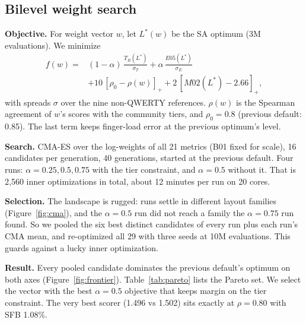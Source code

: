 \documentclass{gecko-paper}
\begin{document}
\begin{paperbody}
\section{Bilevel weight search}
\textbf{Objective.} For weight vector $w$, let $L^*(w)$ be the SA optimum (3M evaluations). We minimize
\begin{align*}
f(w) ={}& (1-\alpha)\,\frac{T_B(L^*)}{\sigma_T} + \alpha\,\frac{E05(L^*)}{\sigma_E}\\
&+ 10\,[\rho_0-\rho(w)]_+ + 2\,[M02(L^*)-2.66]_+,
\end{align*}
with spreads $\sigma$ over the nine non-QWERTY references. $\rho(w)$ is the Spearman agreement of $w$'s scores with the community tiers, and $\rho_0=0.8$ (previous default: 0.85). The last term keeps finger-load error at the previous optimum's level.

\textbf{Search.} CMA-ES over the log-weights of all 21 metrics (B01 fixed for scale), 16 candidates per generation, 40 generations, started at the previous default. Four runs: $\alpha=0.25, 0.5, 0.75$ with the tier constraint, and $\alpha=0.5$ without it. That is 2{,}560 inner optimizations in total, about 12 minutes per run on 20 cores.


\textbf{Selection.} The landscape is rugged: runs settle in different layout families (Figure~\ref{fig:cma}), and the $\alpha=0.5$ run did not reach a family the $\alpha=0.75$ run found. So we pooled the six best distinct candidates of every run plus each run's CMA mean, and re-optimized all 29 with three seeds at 10M evaluations. This guards against a lucky inner optimization.


\textbf{Result.} Every pooled candidate dominates the previous default's optimum on both axes (Figure~\ref{fig:frontier}). Table~\ref{tab:pareto} lists the Pareto set. We select the vector with the best $\alpha=0.5$ objective that keeps margin on the tier constraint. The very best scorer (1.496 vs 1.502) sits exactly at $\rho=0.80$ with SFB 1.08\%.


\end{paperbody}
\end{document}
